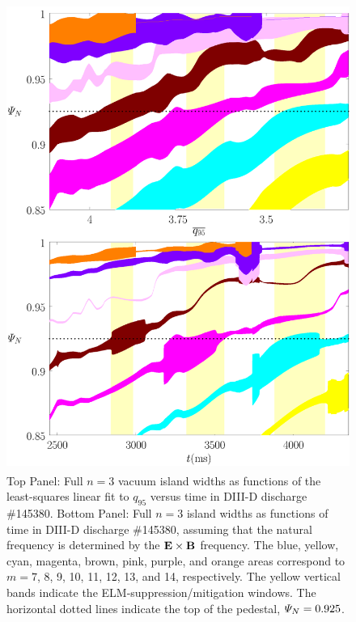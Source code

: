 \documentclass[12pt,prb,aps]{revtex4-1}
\begin{document}
\begin{figure}
\includegraphics[height=6in]{fig5.pdf}
\caption{Top Panel: Full  $n=3$ vacuum island widths as functions of the least-squares linear fit to $q_{95}$ versus time 
in   DIII-D discharge \#145380.
Bottom Panel:  Full $n=3$ island widths as functions of time
in   DIII-D discharge \#145380, assuming that the natural frequency is determined by the ${\bf E}\times {\bf B}$
frequency. The blue, yellow, cyan, magenta, brown, pink,
purple, and orange  areas correspond to $m=7$, 8, 9, 10, 11, 12, 13, and 14, respectively. The yellow vertical bands indicate the ELM-suppression/mitigation windows. 
The horizontal dotted lines indicate the top of the pedestal, ${\mit\Psi}_N=0.925$.} \label{fig5}
\end{figure}
\end{document}

